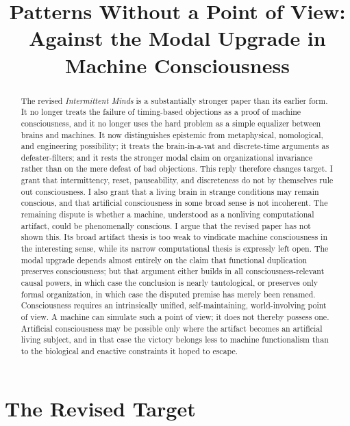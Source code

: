 \documentclass[11pt]{article}
\title{\textbf{Patterns Without a Point of View:\\ Against the Modal Upgrade in Machine Consciousness}}
\author{}
\date{}
\begin{document}
\maketitle
\vspace{-3.5em}

\begin{abstract}
\noindent The revised \emph{Intermittent Minds} is a substantially stronger paper than its earlier form. It no longer treats the failure of timing-based objections as a proof of machine consciousness, and it no longer uses the hard problem as a simple equalizer between brains and machines. It now distinguishes epistemic from metaphysical, nomological, and engineering possibility; it treats the brain-in-a-vat and discrete-time arguments as defeater-filters; and it rests the stronger modal claim on organizational invariance rather than on the mere defeat of bad objections. This reply therefore changes target. I grant that intermittency, reset, pauseability, and discreteness do not by themselves rule out consciousness. I also grant that a living brain in strange conditions may remain conscious, and that artificial consciousness in some broad sense is not incoherent. The remaining dispute is whether a machine, understood as a nonliving computational artifact, could be phenomenally conscious. I argue that the revised paper has not shown this. Its broad artifact thesis is too weak to vindicate machine consciousness in the interesting sense, while its narrow computational thesis is expressly left open. The modal upgrade depends almost entirely on the claim that functional duplication preserves consciousness; but that argument either builds in all consciousness-relevant causal powers, in which case the conclusion is nearly tautological, or preserves only formal organization, in which case the disputed premise has merely been renamed. Consciousness requires an intrinsically unified, self-maintaining, world-involving point of view. A machine can simulate such a point of view; it does not thereby possess one. Artificial consciousness may be possible only where the artifact becomes an artificial living subject, and in that case the victory belongs less to machine functionalism than to the biological and enactive constraints it hoped to escape.
\end{abstract}

\section{The Revised Target}
\end{document}
